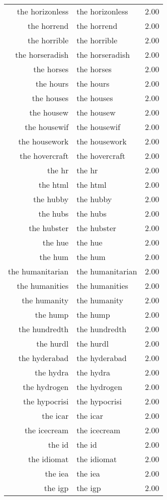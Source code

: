 \begin{table}[ht]
\begin{tabular}{rlr}
  the horizonless & the horizonless & 2.00 \\ 
  the horrend & the horrend & 2.00 \\ 
  the horrible & the horrible & 2.00 \\ 
  the horseradish & the horseradish & 2.00 \\ 
  the horses & the horses & 2.00 \\ 
  the hours & the hours & 2.00 \\ 
  the houses & the houses & 2.00 \\ 
  the housew & the housew & 2.00 \\ 
  the housewif & the housewif & 2.00 \\ 
  the housework & the housework & 2.00 \\ 
  the hovercraft & the hovercraft & 2.00 \\ 
  the hr & the hr & 2.00 \\ 
  the html & the html & 2.00 \\ 
  the hubby & the hubby & 2.00 \\ 
  the hubs & the hubs & 2.00 \\ 
  the hubster & the hubster & 2.00 \\ 
  the hue & the hue & 2.00 \\ 
  the hum & the hum & 2.00 \\ 
  the humanitarian & the humanitarian & 2.00 \\ 
  the humanities & the humanities & 2.00 \\ 
  the humanity & the humanity & 2.00 \\ 
  the hump & the hump & 2.00 \\ 
  the hundredth & the hundredth & 2.00 \\ 
  the hurdl & the hurdl & 2.00 \\ 
  the hyderabad & the hyderabad & 2.00 \\ 
  the hydra & the hydra & 2.00 \\ 
  the hydrogen & the hydrogen & 2.00 \\ 
  the hypocrisi & the hypocrisi & 2.00 \\ 
  the icar & the icar & 2.00 \\ 
  the icecream & the icecream & 2.00 \\ 
  the id & the id & 2.00 \\ 
  the idiomat & the idiomat & 2.00 \\ 
  the iea & the iea & 2.00 \\ 
  the igp & the igp & 2.00 \\ 

\end{tabular}
\end{table}
